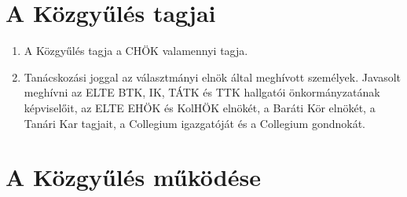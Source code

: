 \documentclass{../styles/rulebook}
\begin{document}
\section{A Közgyűlés tagjai}

\begin{enumerate}
	\item A Közgyűlés tagja a CHÖK valamennyi tagja.
	\item Tanácskozási joggal az választmányi elnök által meghívott személyek. Javasolt meghívni az ELTE BTK, IK, TÁTK és TTK hallgatói önkormányzatának képviselőit, az ELTE EHÖK és KolHÖK elnökét, a Baráti Kör elnökét, a Tanári Kar tagjait, a Collegium igazgatóját és a Collegium gondnokát.
\end{enumerate}

\section{A Közgyűlés működése}
\end{document}
